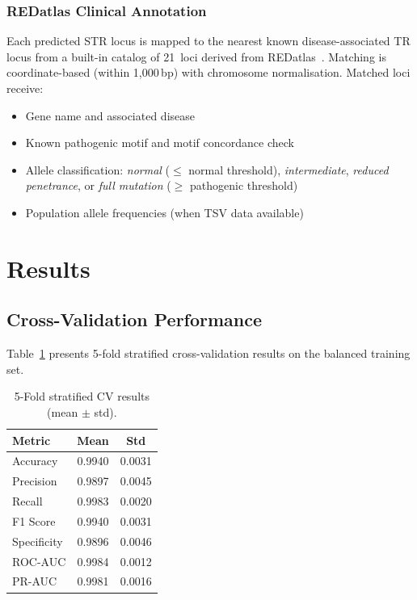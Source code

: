 \documentclass[11pt,twocolumn]{article}
\begin{document}
\subsubsection{REDatlas Clinical Annotation}
\label{sec:redatlas}
Each predicted STR locus is mapped to the nearest known
disease-associated TR locus from a built-in catalog of 21~loci derived
from REDatlas~\citep{rajanbabu2025}.  Matching is coordinate-based
(within 1{,}000\,bp) with chromosome normalisation.  Matched loci
receive:

\begin{itemize}[nosep]
    \item Gene name and associated disease
    \item Known pathogenic motif and motif concordance check
    \item Allele classification: \emph{normal} ($\leq$ normal threshold),
          \emph{intermediate}, \emph{reduced penetrance}, or
          \emph{full mutation} ($\geq$ pathogenic threshold)
    \item Population allele frequencies (when TSV data available)
\end{itemize}

\section{Results}\label{sec:results}

\subsection{Cross-Validation Performance}

Table~\ref{tab:cv_results} presents 5-fold stratified cross-validation
results on the balanced training set.

\begin{table}[t]
\centering
\caption{5-Fold stratified CV results (mean $\pm$ std).}
\label{tab:cv_results}
\begin{tabular}{@{}lcc@{}}
\toprule
\textbf{Metric} & \textbf{Mean} & \textbf{Std} \\
\midrule
Accuracy & 0.9940 & 0.0031 \\
Precision & 0.9897 & 0.0045 \\
Recall & 0.9983 & 0.0020 \\
F1 Score & 0.9940 & 0.0031 \\
Specificity & 0.9896 & 0.0046 \\
ROC-AUC & 0.9984 & 0.0012 \\
PR-AUC & 0.9981 & 0.0016 \\
\bottomrule
\end{tabular}
\end{table}
\end{document}

